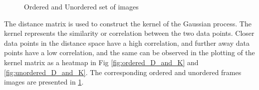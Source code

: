 	\begin{figure}[h]
		\centering
		\qquad
		\caption{Ordered and Unordered set of images}%
		\label{fig:ordered_and_unordered_images}%
	\end{figure}
	
	The distance matrix is used to construct the kernel of the Gaussian process. The kernel represents the similarity or correlation between the two data points. Closer data points in the distance space have a high correlation, and further away data points have a low correlation, and the same can be observed in the plotting of the kernel matrix as a heatmap in Fig \ref{fig:ordered_D_and_K} and \ref{fig:unordered_D_and_K}. The corresponding ordered and unordered frames images are presented in \ref{fig:ordered_and_unordered_images}.  
	
